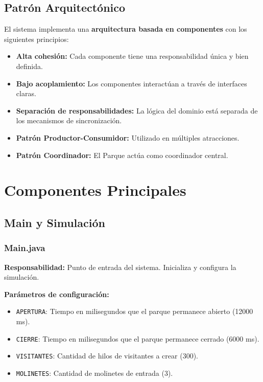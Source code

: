 \documentclass[12pt,a4paper]{article}
\begin{document}
\subsection{Patrón Arquitectónico}

El sistema implementa una \textbf{arquitectura basada en componentes} con los siguientes principios:

\begin{itemize}
    \item \textbf{Alta cohesión:} Cada componente tiene una responsabilidad única y bien definida.
    \item \textbf{Bajo acoplamiento:} Los componentes interactúan a través de interfaces claras.
    \item \textbf{Separación de responsabilidades:} La lógica del dominio está separada de los mecanismos de sincronización.
    \item \textbf{Patrón Productor-Consumidor:} Utilizado en múltiples atracciones.
    \item \textbf{Patrón Coordinador:} El Parque actúa como coordinador central.
\end{itemize}
\newpage

\section{Componentes Principales}
\subsection{Main y Simulación}

\subsubsection{Main.java}

\textbf{Responsabilidad:} Punto de entrada del sistema. Inicializa y configura la simulación.

\textbf{Parámetros de configuración:}
\begin{itemize}
    \item \texttt{APERTURA}: Tiempo en milisegundos que el parque permanece abierto (12000 ms).
    \item \texttt{CIERRE}: Tiempo en milisegundos que el parque permanece cerrado (6000 ms).
    \item \texttt{VISITANTES}: Cantidad de hilos de visitantes a crear (300).
    \item \texttt{MOLINETES}: Cantidad de molinetes de entrada (3).
\end{itemize}
\end{document}

